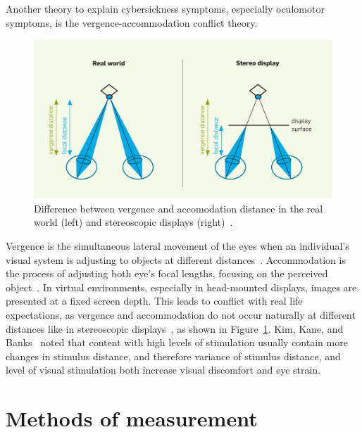 Another theory to explain cybersickness symptoms, especially oculomotor symptoms, is the \mbox{vergence-accommodation}
conflict theory.
\begin{figure}[h]
    \centering
    \includegraphics[width=\textwidth/2]{content/related_work/img/VergenceAccommodation[Kroeker2010]}
    \caption{Difference between vergence and accomodation distance in the real world (left) and stereoscopic displays
        (right)~\cite{Kroeker2010}.}
    \label{fig:vergence-accommodation-differences}
\end{figure}
Vergence is the simultaneous lateral movement of the eyes when an individual's visual system is adjusting to objects
at different distances~\cite{Kim2014}.
Accommodation is the process of adjusting both eye's focal lengths, focusing on the perceived
object~\cite{Rebenitsch2016}.
In virtual environments, especially in head-mounted displays, images are presented at a fixed screen depth.
This leads to conflict with real life expectations, as vergence and accommodation do not occur naturally at
different distances like in stereoscopic displays~\cite{Saredakis2020}, as shown in
Figure~\ref{fig:vergence-accommodation-differences}.
Kim, Kane, and Banks~\cite{Kim2014} noted that content with high levels of stimulation usually contain more changes
in stimulus distance, and therefore variance of stimulus distance, and level of visual stimulation both increase visual
discomfort and eye strain.


\section{Methods of measurement}\label{sec:methods-of-measurement}

